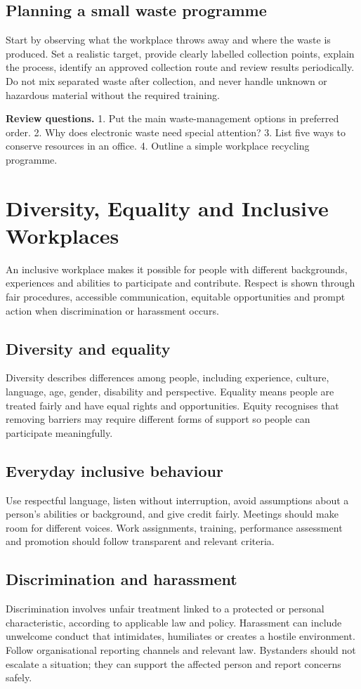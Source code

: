 \documentclass[11pt,openany,oneside]{book}
\newcommand{\exampractice}[1]{\begin{tcolorbox}[colback=LightGold,colframe=Gold,boxrule=.6pt,arc=1.2mm,left=2mm,right=2mm,top=1mm,bottom=1mm]\textbf{Review questions.} #1\end{tcolorbox}}
\begin{document}
\section{Planning a small waste programme}
Start by observing what the workplace throws away and where the waste is produced. Set a realistic target, provide clearly labelled collection points, explain the process, identify an approved collection route and review results periodically. Do not mix separated waste after collection, and never handle unknown or hazardous material without the required training.

\exampractice{1. Put the main waste-management options in preferred order. 2. Why does electronic waste need special attention? 3. List five ways to conserve resources in an office. 4. Outline a simple workplace recycling programme.}

\chapter{Diversity, Equality and Inclusive Workplaces}
An inclusive workplace makes it possible for people with different backgrounds, experiences and abilities to participate and contribute. Respect is shown through fair procedures, accessible communication, equitable opportunities and prompt action when discrimination or harassment occurs.

\section{Diversity and equality}
Diversity describes differences among people, including experience, culture, language, age, gender, disability and perspective. Equality means people are treated fairly and have equal rights and opportunities. Equity recognises that removing barriers may require different forms of support so people can participate meaningfully.

\section{Everyday inclusive behaviour}
Use respectful language, listen without interruption, avoid assumptions about a person's abilities or background, and give credit fairly. Meetings should make room for different voices. Work assignments, training, performance assessment and promotion should follow transparent and relevant criteria.

\section{Discrimination and harassment}
Discrimination involves unfair treatment linked to a protected or personal characteristic, according to applicable law and policy. Harassment can include unwelcome conduct that intimidates, humiliates or creates a hostile environment. Follow organisational reporting channels and relevant law. Bystanders should not escalate a situation; they can support the affected person and report concerns safely.
\end{document}
